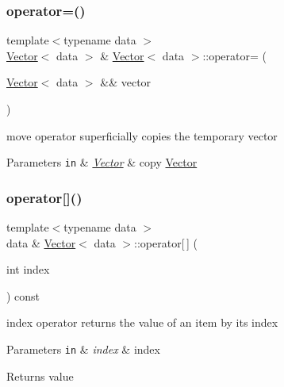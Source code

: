 \subsubsection{\texorpdfstring{operator=()}{operator=()}\hspace{0.1cm}{\footnotesize\ttfamily [2/2]}}
{\footnotesize\ttfamily template$<$typename data $>$ \\
\hyperlink{classVector}{Vector}$<$ data $>$ \& \hyperlink{classVector}{Vector}$<$ data $>$\+::operator= (\begin{DoxyParamCaption}\item[{\hyperlink{classVector}{Vector}$<$ data $>$ \&\&}]{vector }\end{DoxyParamCaption})}



move operator  superficially copies the temporary vector 


\begin{DoxyParams}[1]{Parameters}
\mbox{\tt in}  & {\em \hyperlink{classVector}{Vector}} & copy \hyperlink{classVector}{Vector} \\
\hline
\end{DoxyParams}
\mbox{\label{classVector_ad3af3ead835defe8350ec5ddb68d225b}} 
\subsubsection{\texorpdfstring{operator[]()}{operator[]()}}
{\footnotesize\ttfamily template$<$typename data $>$ \\
data \& \hyperlink{classVector}{Vector}$<$ data $>$\+::operator\mbox{[}$\,$\mbox{]} (\begin{DoxyParamCaption}\item[{int}]{index }\end{DoxyParamCaption}) const}



index operator  returns the value of an item by its index 


\begin{DoxyParams}[1]{Parameters}
\mbox{\tt in}  & {\em index} & index \\
\hline
\end{DoxyParams}
\begin{DoxyReturn}{Returns}
value 
\end{DoxyReturn}
\mbox{\label{classVector_af58fb997ed40663eb1e9f17b96cbc846}} 
